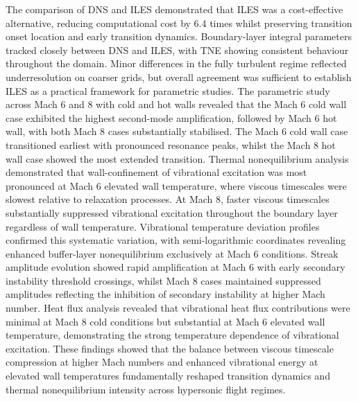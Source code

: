 The comparison of \gls{DNS} and \gls{ILES} demonstrated that \gls{ILES} was a cost-effective alternative, reducing computational cost by 6.4 times whilst preserving transition onset location and early transition dynamics. Boundary-layer integral parameters tracked closely between \gls{DNS} and \gls{ILES}, with \gls{TNE} showing consistent behaviour throughout the domain. Minor differences in the fully turbulent regime reflected underresolution on coarser grids, but overall agreement was sufficient to establish \gls{ILES} as a practical framework for parametric studies. The parametric study across Mach 6 and 8 with cold and hot walls revealed that the Mach 6 cold wall case exhibited the highest second-mode amplification, followed by Mach 6 hot wall, with both Mach 8 cases substantially stabilised. The Mach 6 cold wall case transitioned earliest with pronounced resonance peaks, whilst the Mach 8 hot wall case showed the most extended transition. Thermal nonequilibrium analysis demonstrated that wall-confinement of vibrational excitation was most pronounced at Mach 6 elevated wall temperature, where viscous timescales were slowest relative to relaxation processes. At Mach 8, faster viscous timescales substantially suppressed vibrational excitation throughout the boundary layer regardless of wall temperature. Vibrational temperature deviation profiles confirmed this systematic variation, with semi-logarithmic coordinates revealing enhanced buffer-layer nonequilibrium exclusively at Mach 6 conditions. Streak amplitude evolution showed rapid amplification at Mach 6 with early secondary instability threshold crossings, whilst Mach 8 cases maintained suppressed amplitudes reflecting the inhibition of secondary instability at higher Mach number. Heat flux analysis revealed that vibrational heat flux contributions were minimal at Mach 8 cold conditions but substantial at Mach 6 elevated wall temperature, demonstrating the strong temperature dependence of vibrational excitation. These findings showed that the balance between viscous timescale compression at higher Mach numbers and enhanced vibrational energy at elevated wall temperatures fundamentally reshaped transition dynamics and thermal nonequilibrium intensity across hypersonic flight regimes.



